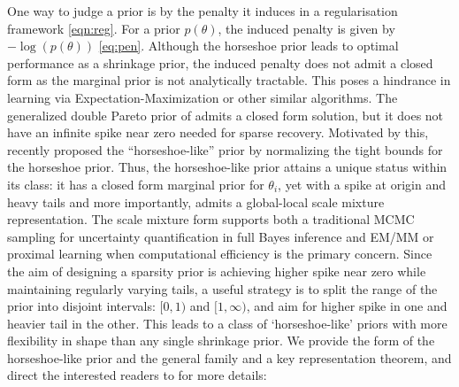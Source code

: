 \documentclass[11pt]{article}
\begin{document}
One way to judge a prior is by the penalty it induces in a regularisation
framework \eqref{eqn:reg}. For a prior $p(\theta)$, the induced penalty is
given by $-\log(p(\theta))$ \eqref{eq:pen}. Although the horseshoe prior leads
to optimal performance as a shrinkage prior, the induced penalty does not admit
a closed form as the marginal prior is not analytically tractable. This poses a
hindrance in learning via Expectation-Maximization or other similar algorithms.
The generalized double Pareto prior of \citet{armagan2011generalized} admits a
closed form solution, but it does not have an infinite spike near zero needed
for sparse recovery. Motivated by this, \citet{bhadra2017horseshoe} recently
proposed the ``horseshoe-like'' prior by normalizing the tight bounds for the
horseshoe prior. Thus, the horseshoe-like prior attains a unique status within
its class: it has a closed form marginal prior for $\theta_i$, yet with a spike
at origin and heavy tails and more importantly, admits a global-local scale
mixture representation. The scale mixture form supports both a traditional MCMC
sampling for uncertainty quantification in full Bayes inference and EM/MM or
proximal learning when computational efficiency is the primary concern. Since
the aim of designing a sparsity prior is achieving higher spike near zero while
maintaining regularly varying tails, a useful strategy is to split the range of
the prior into disjoint intervals: $[0,1)$ and $[1, \infty)$, and aim for
higher spike in one and heavier tail in the other. This leads to a class of
`horseshoe-like' priors with more flexibility in shape than any single
shrinkage prior. We provide the form of the horseshoe-like prior and the
general family and a key representation theorem, and direct the interested
readers to \citet{bhadra2017horseshoe} for more details: 
\end{document}

